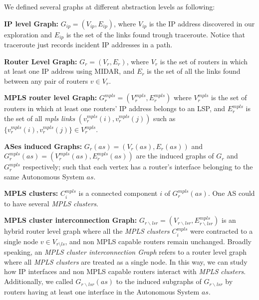 We defined several graphs at different abstraction levels as following: 


\textbf{IP level Graph:} $G_{ip}=(V_{ip}, E_{ip})$, where $V_{ip}$ is the IP address discovered in our exploration and $E_{ip}$ is the set of the links found trough traceroute.
Notice that traceroute just records incident IP addresses in a path.

\textbf{Router Level Graph:} $G_{r}=(V_{r}, E_{r})$, where $V_{r}$ is the set of
routers in which at least one IP address using MIDAR, and $E_{r}$ is the set of
all the links found between any pair of routers $v\in V_{r}$.   

\textbf{MPLS router level Graph:} $G^{mpls}_{r}=(V^{mpls}_{r}, E^{mpls}_{r})$
where  $V^{mpls}_{r}$ is the set of routers in which at least one routers' IP
address belongs to an LSP, and  $E^{mpls}_{r}$ is the set of all \textit{mpls
links} $(v^{mpls}_{r}(i), v^{mpls}_{r}(j))$ such as
$\{{v^{mpls}_{r}(i)},{v^{mpls}_{r}(j)} \}\in V^{mpls}_{r}$.   

\textbf{ASes induced Graphs:} $G_{r}(as)=(V_{r}(as), E_{r}(as))$ and $G^{mpls}_{r}(as)=(V^{mpls}_{r}(as), E^{mpls}_{r}(as))$ are the induced graphs of $G_{r}$ and $G^{mpls}_{r}$ respectively; such that each vertex has a router's interface belonging to the same Autonomous System $as$.

\textbf{MPLS clusters:} $C^{mpls}_{i}$ is a connected component $i$ of $G^{mpls}_{r}(as)$. 
One AS could to have several \textit{MPLS clusters}.    

\textbf{MPLS cluster interconnection Graph:} $G_{r\backslash lsr}=(V_{r\backslash lsr},E^{mpls}_{r\backslash lsr})$ is an hybrid router level graph where all the \textit{MPLS clusters}  $C^{mpls}_{i}$ were contracted to a single node $v\in V_{r\setminus ls}$, and non MPLS capable routers remain unchanged. 
Broadly speaking, an \textit{MPLS cluster interconnection Graph} refers to a router level graph where all \textit{MPLS clusters} are treated as a single node. In this way, we can study how IP interfaces and non MPLS capable routers interact with \textit{MPLS clusters}. 
Additionally, we called $G_{r\backslash lsr}(as)$ to the induced subgraphs of $G_{r\backslash lsr}$ by routers having at least one interface in the Autonomous System $as$.


